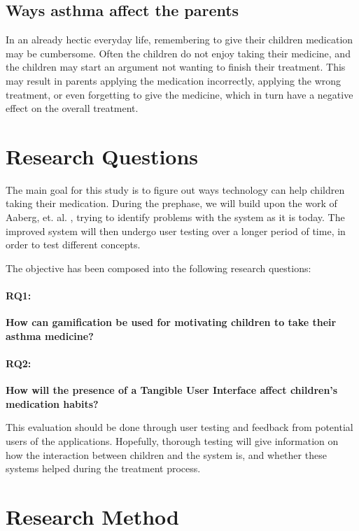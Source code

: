 \subsection{Ways asthma affect the parents}
In an already hectic everyday life, remembering to give their children medication may be cumbersome. Often the children do not enjoy taking their medicine, and the children may start an argument not wanting to finish their treatment. This may result in parents applying the medication incorrectly, applying the wrong treatment, or even forgetting to give the medicine, which in turn have a negative effect on the overall treatment.  



\section{Research Questions}
\label{sec:researchquestions}
The main goal for this study is to figure out ways technology can help children taking their medication. During the prephase, we will build upon the work of Aaberg, et. al.  \cite{CustomerDriven}, trying to identify problems with the system as it is today. The improved system will then undergo user testing over a longer period of time, in order to test different concepts.


The objective has been composed into the following research questions: 

\paragraph{RQ1:}
\textbf{How can gamification be used for motivating children to take their asthma medicine?}


\paragraph{RQ2:}
\textbf{How will the presence of a Tangible User Interface affect children's medication habits?}


This evaluation should be done through user testing and feedback from potential users of the applications. Hopefully, thorough testing will give information on how the interaction between children and the system is, and whether these systems helped during the treatment process.

\section{Research Method}
\label{sec:researchmethod}



